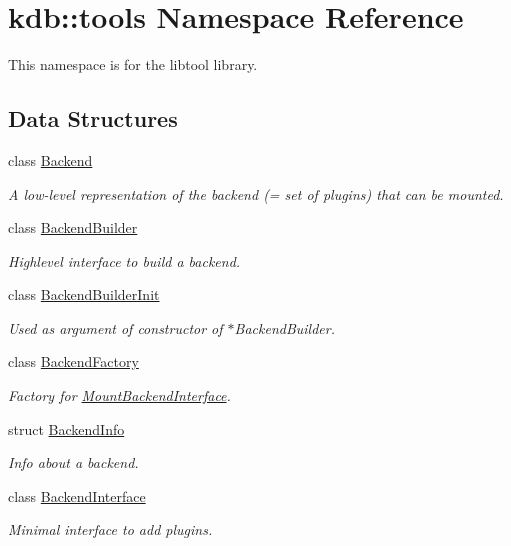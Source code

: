 \hypertarget{namespacekdb_1_1tools}{\section{kdb\+:\+:tools Namespace Reference}
\label{namespacekdb_1_1tools}
}


This namespace is for the libtool library.  


\subsection*{Data Structures}
\begin{DoxyCompactItemize}
\item 
class \hyperlink{classkdb_1_1tools_1_1Backend}{Backend}
\begin{DoxyCompactList}\small\item\em A low-\/level representation of the backend (= set of plugins) that can be mounted. \end{DoxyCompactList}\item 
class \hyperlink{classkdb_1_1tools_1_1BackendBuilder}{Backend\+Builder}
\begin{DoxyCompactList}\small\item\em Highlevel interface to build a backend. \end{DoxyCompactList}\item 
class \hyperlink{classkdb_1_1tools_1_1BackendBuilderInit}{Backend\+Builder\+Init}
\begin{DoxyCompactList}\small\item\em Used as argument of constructor of $\ast$\+Backend\+Builder. \end{DoxyCompactList}\item 
class \hyperlink{classkdb_1_1tools_1_1BackendFactory}{Backend\+Factory}
\begin{DoxyCompactList}\small\item\em Factory for \hyperlink{classkdb_1_1tools_1_1MountBackendInterface}{Mount\+Backend\+Interface}. \end{DoxyCompactList}\item 
struct \hyperlink{structkdb_1_1tools_1_1BackendInfo}{Backend\+Info}
\begin{DoxyCompactList}\small\item\em Info about a backend. \end{DoxyCompactList}\item 
class \hyperlink{classkdb_1_1tools_1_1BackendInterface}{Backend\+Interface}
\begin{DoxyCompactList}\small\item\em Minimal interface to add plugins. \end{DoxyCompactList}\item 

\end{DoxyCompactItemize}
